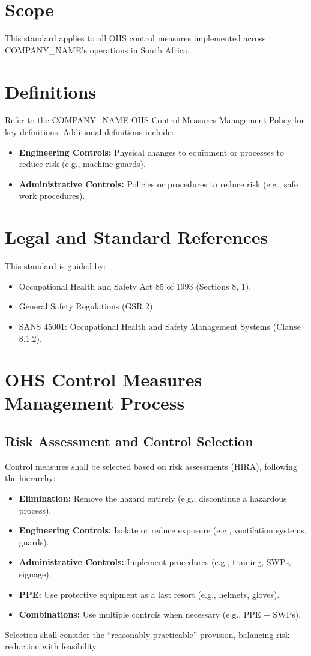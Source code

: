 \documentclass[12pt]{article}
\begin{document}
\section{Scope}
This standard applies to all OHS control measures implemented across {{COMPANY_NAME}}’s operations in South Africa.

\section{Definitions}
Refer to the {{COMPANY_NAME}} OHS Control Measures Management Policy for key definitions. Additional definitions include:
\begin{itemize}
    \item \textbf{Engineering Controls:} Physical changes to equipment or processes to reduce risk (e.g., machine guards).
    \item \textbf{Administrative Controls:} Policies or procedures to reduce risk (e.g., safe work procedures).
\end{itemize}

\section{Legal and Standard References}
This standard is guided by:
\begin{itemize}
    \item Occupational Health and Safety Act 85 of 1993 (Sections 8, 1).
    \item General Safety Regulations (GSR 2).
    \item SANS 45001: Occupational Health and Safety Management Systems (Clause 8.1.2).
\end{itemize}

\section{OHS Control Measures Management Process}

\subsection{Risk Assessment and Control Selection}
Control measures shall be selected based on risk assessments (HIRA), following the hierarchy:
\begin{itemize}
    \item \textbf{Elimination:} Remove the hazard entirely (e.g., discontinue a hazardous process).
    \item \textbf{Engineering Controls:} Isolate or reduce exposure (e.g., ventilation systems, guards).
    \item \textbf{Administrative Controls:} Implement procedures (e.g., training, SWPs, signage).
    \item \textbf{PPE:} Use protective equipment as a last resort (e.g., helmets, gloves).
    \item \textbf{Combinations:} Use multiple controls when necessary (e.g., PPE + SWPs).
\end{itemize}
Selection shall consider the “reasonably practicable” provision, balancing risk reduction with feasibility.
\end{document}
